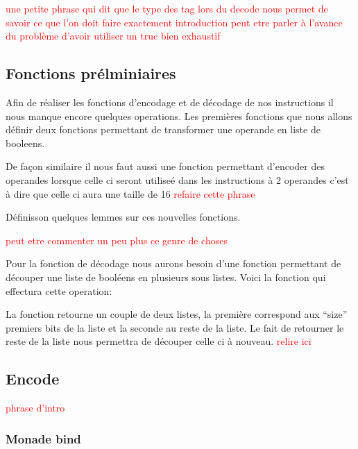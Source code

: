 \documentclass {article}
\newcommand{\codefrom}[3]
           {}
\theoremstyle{definition}
\theoremstyle{remark}
\newcommand{\todo}[1]{\textcolor{red}{#1}}
\begin{document}
\todo{une petite phrase qui dit que le type des tag lors du decode nous permet de savoir ce que l'on doit faire exactement}
\todo{introduction peut etre parler à l'avance du problème d'avoir utiliser un truc bien exhaustif}



\subsection{Fonctions prélminiaires}

Afin de réaliser les fonctions d'encodage et de décodage de nos instructions il nous manque encore quelques operations.
Les premières fonctions que nous allons définir deux fonctions permettant de transformer une operande en liste de booleens.

\codefrom{src}{encode}{operand_to_bin}

De façon similaire il nous faut aussi une fonction permettant d'encoder des operandes lorsque celle ci seront utiliseé dans
les instructions à 2 operandes c'est à dire que celle ci aura une taille de 16 \todo{refaire cette phrase}

\codefrom{src}{encode}{operand_to_bin_double}

Définisson quelques lemmes sur ces nouvelles fonctions.
\codefrom{src}{encode}{operand_to_bin_hypothesis_reg}
\codefrom{src}{encode}{operand_to_bin_hypothesis_imm}
\codefrom{src}{encode}{operand_to_bin_size}
\todo{peut etre commenter un peu plus ce genre de choses}


Pour la fonction de décodage nous aurons besoin d'une fonction permettant de découper
une liste de booléens en plusieurs sous listes. Voici la fonction qui effectura cette operation:

\codefrom{src}{encode}{get_first_n_bit}

La fonction retourne un couple de deux listes, la première correspond aux ``size'' premiers
bits de la liste et la seconde au reste  de la liste. Le fait de retourner le reste de la liste
nous permettra de découper celle ci à nouveau.
\todo{relire ici}




\subsection{Encode}

\todo{phrase d'intro}

\subsubsection{Monade bind}
\end{document}
